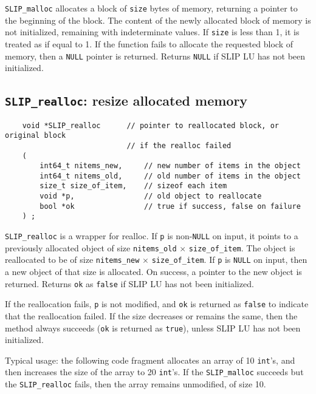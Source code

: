 \documentclass[12pt]{article}
\theoremstyle{definition}
\begin{document}
\verb|SLIP_malloc| allocates a block of \verb|size| bytes of memory, returning
a pointer to the beginning of the block. The content of the newly allocated
block of memory is not initialized, remaining with indeterminate values.
If \verb|size| is less than 1, it is treated as if equal to 1. If the function
fails to allocate the requested block of memory, then a \verb|NULL| pointer is
returned.
Returns \verb|NULL| if SLIP LU has not been initialized.

\cprotect\subsection{\verb|SLIP_realloc|: resize allocated memory}
\label{ss:SLIP_realloc}

\begin{mdframed}[userdefinedwidth=6in]
{\footnotesize
\begin{verbatim}
    void *SLIP_realloc      // pointer to reallocated block, or original block
                            // if the realloc failed
    (
        int64_t nitems_new,     // new number of items in the object
        int64_t nitems_old,     // old number of items in the object
        size_t size_of_item,    // sizeof each item
        void *p,                // old object to reallocate
        bool *ok                // true if success, false on failure
    ) ;
\end{verbatim}
} \end{mdframed}

\verb|SLIP_realloc| is a wrapper for realloc.  If \verb|p| is non-\verb|NULL| on
input, it points to a previously allocated object of size \verb|nitems_old|
$\times$ \verb|size_of_item|.  The object is reallocated to be of size
\verb|nitems_new| $\times$ \verb|size_of_item|.  If \verb|p| is \verb|NULL| on input,
then a new object of that size is allocated.  On success, a pointer to the new
object is returned.  Returns \verb|ok| as \verb|false| if SLIP LU has not been
initialized.

If the reallocation fails, \verb|p| is not modified, and \verb|ok| is returned
as \verb|false| to indicate that the reallocation failed.  If the size
decreases or remains the same, then the method always succeeds (\verb|ok| is
returned as \verb|true|), unless SLIP LU has not been initialized.

Typical usage:  the following code fragment allocates an array of 10
\verb|int|'s, and then increases the size of the array to 20 \verb|int|'s.  If
the \verb|SLIP_malloc| succeeds but the \verb|SLIP_realloc| fails, then the
array remains unmodified, of size 10.
\end{document}
